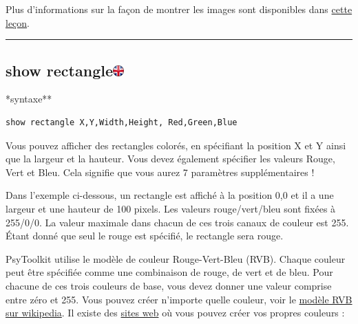 \documentclass[
]{book}
\begin{document}
Plus d'informations sur la façon de montrer les images sont disponibles
dans \href{https://www.psytoolkit.org/lessons/show_bitmaps.html}{cette
leçon}.

\begin{center}\rule{0.5\linewidth}{\linethickness}\end{center}

\hypertarget{show-rectangle}{%
\subsection[show rectangle]{\texorpdfstring{show
rectangle\href{https://www.psytoolkit.org/doc3.2.0/syntax.html\#task-show-rectangle}{\protect\includegraphics{img/ukflag.png}}}{show rectangle}}\label{show-rectangle}}

*syntaxe**

\begin{verbatim}
show rectangle X,Y,Width,Height, Red,Green,Blue
\end{verbatim}

Vous pouvez afficher des rectangles colorés, en spécifiant la position X
et Y ainsi que la largeur et la hauteur. Vous devez également spécifier
les valeurs Rouge, Vert et Bleu. Cela signifie que vous aurez 7
paramètres supplémentaires !

Dans l'exemple ci-dessous, un rectangle est affiché à la position 0,0 et
il a une largeur et une hauteur de 100 pixels. Les valeurs
rouge/vert/bleu sont fixées à 255/0/0. La valeur maximale dans chacun de
ces trois canaux de couleur est 255. Étant donné que seul le rouge est
spécifié, le rectangle sera rouge.

PsyToolkit utilise le modèle de couleur Rouge-Vert-Bleu (RVB). Chaque
couleur peut être spécifiée comme une combinaison de rouge, de vert et
de bleu. Pour chacune de ces trois couleurs de base, vous devez donner
une valeur comprise entre zéro et 255. Vous pouvez créer n'importe
quelle couleur, voir le \href{http://fr.wikipedia.org/wiki/Rgb}{modèle
RVB sur wikipedia}. Il existe des
\href{https://www.rapidtables.com/web/color/RGB_Color.html}{sites web}
où vous pouvez créer vos propres couleurs :
\end{document}
